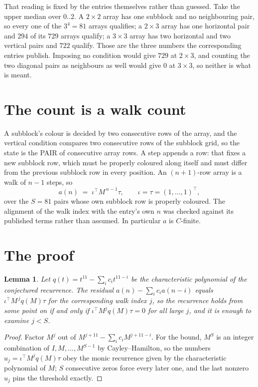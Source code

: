 \documentclass[11pt,a4paper]{article}
\theoremstyle{plain}
\newtheorem{lemma}[theorem]{Lemma}
\theoremstyle{definition}
\begin{document}
That reading is fixed by the entries themselves rather than guessed. Take the upper median
over $0..2$. A $2\times2$ array has one subblock and no neighbouring pair, so every one of the
$3^4=81$ arrays qualifies; a $2\times3$ array has one horizontal pair and $294$ of its $729$
arrays qualify; a $3\times3$ array has two horizontal and two vertical pairs and $722$
qualify. Those are the three numbers the corresponding entries publish. Imposing no condition
would give $729$ at $2\times3$, and counting the two diagonal pairs as neighbours as well
would give $0$ at $3\times3$, so neither is what is meant.

\section{The count is a walk count}

A subblock's colour is decided by two consecutive rows of the array, and
the vertical condition compares two consecutive rows of the subblock grid, so the state is the
PAIR of consecutive array rows. A step appends a row: that fixes a new subblock row, which
must be properly coloured along itself and must differ from the previous subblock row in every
position. An $(n+1)$-row array is a walk of $n-1$ steps, so
\[
a(n)\;=\;\iota^{\!\top}M^{\,n-1}\tau,\qquad\iota=\tau=(1,\dots,1)^{\!\top},
\]
over the $S=81$ pairs whose own subblock row is properly coloured.
The alignment of the walk index with the entry's own $n$ was checked against its published
terms rather than assumed. In particular $a$ is $C$-finite.

\section{The proof}

\begin{lemma}\label{lem:crit}
Let $q(t)=t^{11}-\sum_i c_it^{11-i}$ be the characteristic polynomial of the
conjectured recurrence. The residual $a(n)-\sum_ic_ia(n-i)$ equals
$\iota^{\!\top}M^{\,j}q(M)\tau$ for the corresponding walk index $j$, so the recurrence
holds from some point on if and only if $\iota^{\!\top}M^{j}q(M)\tau=0$ for all large $j$,
and it is enough to examine $j<S$.
\end{lemma}

\begin{proof}
Factor $M^{j}$ out of $M^{j+11}-\sum_ic_iM^{j+11-i}$. For the bound, $M^{S}$
is an integer combination of $I,M,\dots,M^{S-1}$ by Cayley--Hamilton, so the numbers
$u_j=\iota^{\!\top}M^{j}q(M)\tau$ obey the monic recurrence given by the characteristic
polynomial of $M$; $S$ consecutive zeros force every later one, and the last nonzero $u_j$
pins the threshold exactly.
\end{proof}
\end{document}
